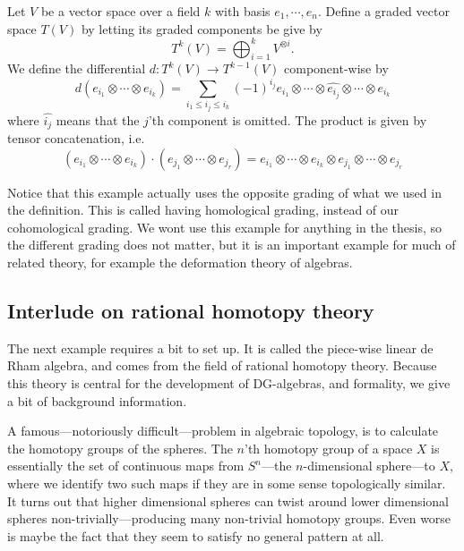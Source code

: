 \begin{example}
Let $V$ be a vector space over a field $k$ with basis $e_1, \cdots, e_n$. Define a graded vector space $T(V)$ by letting its graded components be give by
\begin{equation*}
    T^k(V) = \bigoplus_{i=1}^k V^{\otimes i}.
\end{equation*}
We define the differential $d\colon T^k(V)\longrightarrow T^{k-1}(V)$ component-wise by
\begin{equation*}
    d(e_{i_1}\otimes \cdots \otimes e_{i_k}) = \sum_{i_1\leq i_j\leq i_k}(-1)^{i_j}e_{i_1}\otimes \cdots \otimes \widehat{e_{i_j}}\otimes \cdots \otimes e_{i_k}
\end{equation*}
where $\widehat{i_j}$ means that the $j$'th component is omitted. The product is given by tensor concatenation, i.e. 
\begin{equation*}
    (e_{i_1}\otimes \cdots \otimes e_{i_k})\cdot(e_{j_1}\otimes \cdots \otimes e_{j_r}) = e_{i_1}\otimes \cdots \otimes e_{i_k}\otimes e_{j_1}\otimes \cdots \otimes e_{j_r}
\end{equation*}
\end{example}

Notice that this example actually uses the opposite grading of what we used in the definition. This is called having homological grading, instead of our cohomological grading. We wont use this example for anything in the thesis, so the different grading does not matter, but it is an important example for much of related theory, for example the deformation theory of algebras. 

\subsection*{Interlude on rational homotopy theory}

The next example requires a bit to set up. It is called the piece-wise linear de Rham algebra, and comes from the field of rational homotopy theory. Because this theory is central for the development of DG-algebras, and formality, we give a bit of background information. 

A famous---notoriously difficult---problem in algebraic topology, is to calculate the homotopy groups of the spheres. The $n$'th homotopy group of a space $X$ is essentially the set of continuous maps from $S^n$---the $n$-dimensional sphere---to $X$, where we identify two such maps if they are in some sense topologically similar. It turns out that higher dimensional spheres can twist around lower dimensional spheres non-trivially---producing many non-trivial homotopy groups. Even worse is maybe the fact that they seem to satisfy no general pattern at all. 

